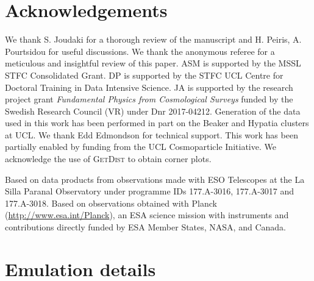 \documentclass[fleqn,usenatbib]{mnras}
\begin{document}
\section*{Acknowledgements}
We thank S. Joudaki for a thorough review of the manuscript and H. Peiris, A. Pourtsidou for useful discussions. We thank the anonymous referee for a meticulous and insightful review of this paper. ASM is supported by the MSSL STFC Consolidated Grant. DP is supported by the STFC UCL Centre for Doctoral Training in Data Intensive Science. JA is supported by the research project grant \emph{Fundamental Physics from Cosmological Surveys} funded by the Swedish Research Council (VR) under Dnr 2017-04212. Generation of the data used in this work has been performed in part on the Beaker and Hypatia clusters at UCL. We thank Edd Edmondson for technical support. This work has been partially enabled by funding from the UCL Cosmoparticle Initiative. We acknowledge the use of \textsc{GetDist} \citep{Lewis19} to obtain corner plots.

Based on data products from observations made with ESO Telescopes at the La Silla Paranal Observatory under programme IDs 177.A-3016, 177.A-3017 and 177.A-3018. Based on observations obtained with Planck (\url{http://www.esa.int/Planck}), an ESA science mission with instruments and contributions directly funded by ESA Member States, NASA, and Canada.




\appendix

\section{Emulation details}\label{app:methods}
\end{document}
